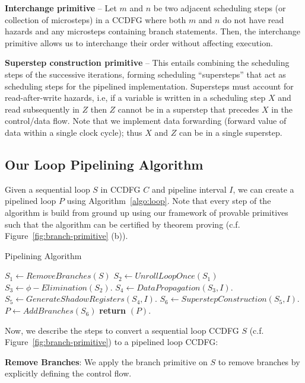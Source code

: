 {\textbf {Interchange primitive}} -- Let $m$ and $n$ be two adjacent scheduling steps (or collection of microsteps) in a CCDFG where both $m$ and $n$ do not have read hazards and any microsteps containing branch statements. Then, the interchange primitive allows us to interchange their order without affecting execution. 

{\textbf {Superstep construction primitive}} -- This entails combining the scheduling steps of the successive
iterations, forming scheduling ``supersteps'' that act as scheduling steps for the pipelined implementation. Supersteps must
account for read-after-write hazards, i.e, if a variable is written in a scheduling step $X$ and read subsequently in
$Z$ then $Z$ cannot be in a superstep that precedes $X$ in the control/data flow.  Note that we implement data
forwarding (forward value of data within a single clock cycle); thus $X$ and $Z$ can be in a single superstep.

\subsection{Our Loop Pipelining Algorithm}

Given a sequential loop $S$ in CCDFG $C$ and pipeline interval $I$, we can create a pipelined loop $P$ using Algorithm~\ref{algo:loop}. Note that every step of the algorithm is build from ground up using our framework of provable primitives such that the algorithm can be certified by theorem proving (c.f. Figure~\ref{fig:branch-primitive} (b)). 

\begin{algorithm}[H]
\caption{Pipelining Algorithm}
\label{algo:loop}
\begin{algorithmic}[1]
\State $S_1 \leftarrow RemoveBranches(S)$
\State $S_2 \leftarrow UnrollLoopOnce(S_1)$
\State $S_3 \leftarrow \phi-Elimination (S_2) $.
\State $S_4 \leftarrow DataPropagation (S_3, I) $.
\State $S_5 \leftarrow GenerateShadowRegisters (S_4, I) $.
\State $ S_6 \leftarrow SuperstepConstruction (S_5, I) $.
\State $P \leftarrow AddBranches (S_6) $
\State \textbf{return} $(P)$.
\EndProcedure
\end{algorithmic}
\end{algorithm}

Now, we describe the steps to convert a sequential loop CCDFG $S$ (c.f. Figure~\ref{fig:branch-primitive}) to a pipelined loop CCDFG:

{\bf Remove Branches}: We apply the branch primitive on $S$ to remove branches by explicitly defining the control flow. 

